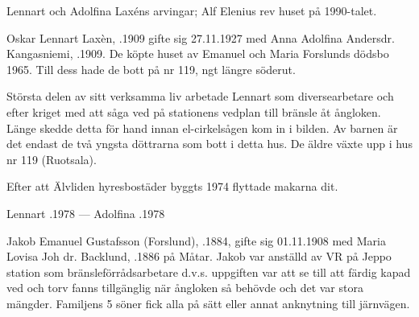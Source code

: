 Lennart och Adolfina Laxéns arvingar; Alf Elenius rev huset på 1990-talet.\jhvspace{}



Oskar Lennart Laxèn, .1909 gifte sig 27.11.1927 med Anna Adolfina Andersdr. Kangasniemi, .1909. De köpte huset av Emanuel och Maria Forslunds dödsbo 1965. Till dess hade de bott på nr 119, ngt längre söderut.

Största delen av sitt verksamma liv arbetade Lennart som diversearbetare och efter kriget med att såga ved på stationens vedplan till bränsle åt ångloken. Länge skedde detta för hand innan el-cirkelsågen kom in i bilden. Av barnen är det endast de två yngsta döttrarna som bott i detta hus. De äldre växte upp i hus nr 119 (Ruotsala).
\begin{jhchildren}
  \item {}
  \item {}
  \item {}
  \item {}
  \item {}
  \item {}
  \item {}
\end{jhchildren}

Efter att Älvliden hyresbostäder byggts 1974 flyttade makarna dit.

Lennart .1978  ---  Adolfina .1978


Jakob Emanuel Gustafsson (Forslund), .1884, gifte sig 01.11.1908 med Maria Lovisa Joh dr. Backlund,  .1886 på Måtar. Jakob var anställd av VR på Jeppo station som bränsleförrådsarbetare d.v.s. uppgiften var att se till att färdig kapad ved och torv fanns tillgänglig när ångloken så behövde och det var stora mängder. Familjens 5 söner fick alla på sätt eller annat anknytning till järnvägen.

